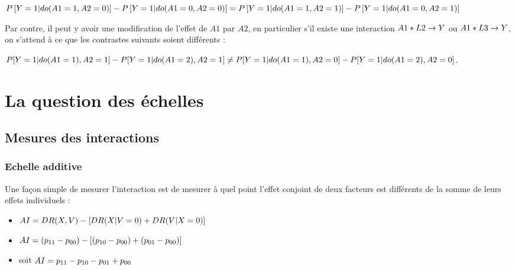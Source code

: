 \documentclass[
]{book}
\providecommand{\tightlist}{%
  \setlength{\itemsep}{0pt}\setlength{\parskip}{0pt}}
\begin{document}
\(\small P\left[Y=1|do(A1=1, A2=0)\right] - P\left[Y=1|do(A1=0, A2=0)\right] = P\left[Y=1|do(A1=1, A2=1)\right] - P\left[Y=1|do(A1=0, A2=1)\right]\)

Par contre, il peut y avoir une modification de l'effet de \(A1\) par \(A2\), en particulier s'il existe une interaction \(\small A1 * L2 \rightarrow Y\) ou \(\small A1 * L3 \rightarrow Y\), on s'attend à ce que les contrastes suivants soient différents :

\(\small P[Y=1|do(A1=1),A2=1] - P[Y=1|do(A1=2),A2=1] \neq P[Y=1|do(A1=1),A2=0] - P[Y=1|do(A1=2),A2=0]\).

\hypertarget{echelle}{%
\chapter{La question des échelles}\label{echelle}}

\hypertarget{mesures-des-interactions}{%
\section{Mesures des interactions}\label{mesures-des-interactions}}

\hypertarget{echelle-additive}{%
\subsection*{Echelle additive}\label{echelle-additive}}

Une façon simple de mesurer l'interaction est de mesurer à quel point l'effet conjoint de deux facteurs est différents de la somme de leurs effets individuels \citet{vanderweele_tutorial_2014} :

\begin{itemize}
\tightlist
\item
  \(\small AI = DR(X,V) - [DR(X|V=0) + DR(V|X=0)]\)
\item
  \(\small AI = (p_{11} - p_{00}) - [(p_{10} - p_{00}) + (p_{01} - p_{00})]\)
\item
  soit \(\small AI =p_{11} - p_{10} - p_{01} + p_{00}\)
\end{itemize}
\end{document}
